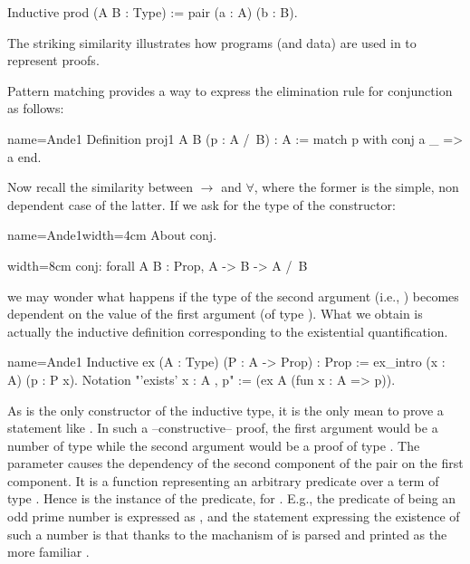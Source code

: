 \begin{coq}{}{}
Inductive prod (A B : Type) := pair (a : A) (b : B).
\end{coq}
The striking similarity illustrates how programs (and data) are used in \Coq{}
to represent proofs.

Pattern matching provides a way to express the elimination rule for
conjunction as follows:

\begin{coq}{name=Ande1}{}
Definition proj1 A B (p : A /\ B) : A :=
  match p with conj a _ => a end.
\end{coq}

Now recall the similarity between $\to$ and $\forall$, where the former is the
simple, non dependent case of the latter.  If we ask for the type of
the  constructor:

\begin{coq}{name=Ande1}{width=4cm}
About conj.
\end{coq}
\begin{coqout}{}{width=8cm}
conj: forall A B : Prop, A -> B -> A /\ B
\end{coqout}
we may wonder what happens if the type of the second argument (i.e., )
becomes dependent on the value of the first argument (of type ).
What we obtain is actually the inductive definition corresponding to the
existential quantification.

\begin{coq}{name=Ande1}{}
Inductive ex (A : Type) (P : A -> Prop) : Prop :=
  ex_intro (x : A) (p : P x).
Notation "'exists' x : A , p" := (ex A (fun x : A => p)).
\end{coq}

As   is the only constructor of the  inductive
type, it is the only mean to prove a statement like
.  In such a --constructive-- proof, the first
argument would be a number
 of type  while the second argument would be a proof  of type
.  The parameter  causes the dependency of the
second component of the pair on the first component. It is a function
representing an arbitrary predicate over a term of
type .  Hence  is the instance of the predicate, for .  E.g.,
the predicate of being an odd prime number is expressed as
, and the statement expressing the
existence of such a number is
 that thanks
to the  machanism of \Coq{} is parsed and
printed as the more familiar .

